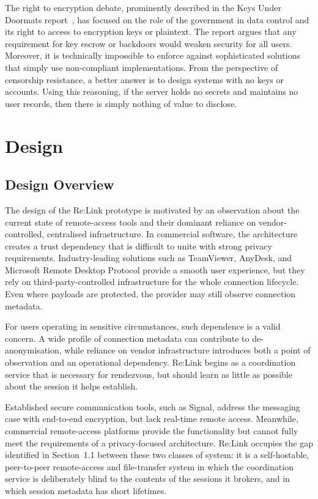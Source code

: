 \documentclass[12pt,a4paper,oneside]{report}
\begin{document}
The right to encryption debate, prominently described in the Keys Under Doormats report~\cite{abelson2015}, has focused on the role of the government in data control and its right to access to encryption keys or plaintext. The report argues that any requirement for key escrow or backdoors would weaken security for all users. Moreover, it is technically impossible to enforce against sophisticated solutions that simply use non-compliant implementations. From the perspective of censorship resistance, a better answer is to design systems with no keys or accounts. Using this reasoning, if the server holds no secrets and maintains no user records, then there is simply nothing of value to disclose.


\chapter{Design}
\label{ch:design}

\section{Design Overview}
\label{sec:design-overview}

The design of the Re:Link prototype is motivated by an observation about the current state of remote-access tools and their dominant reliance on vendor-controlled, centralised infrastructure. In commercial software, the architecture creates a trust dependency that is difficult to unite with strong privacy requirements. Industry-leading solutions such as TeamViewer, AnyDesk, and Microsoft Remote Desktop Protocol provide a smooth user experience, but they rely on third-party-controlled infrastructure for the whole connection lifecycle. Even where payloads are protected, the provider may still observe connection metadata.

For users operating in sensitive circumstances, such dependence is a valid concern. A wide profile of connection metadata can contribute to de-anonymisation, while reliance on vendor infrastructure introduces both a point of observation and an operational dependency. Re:Link begins as a coordination service that is necessary for rendezvous, but should learn as little as possible about the session it helps establish.

Established secure communication tools, such as Signal, address the messaging case with end-to-end encryption, but lack real-time remote access. Meanwhile, commercial remote-access platforms provide the functionality but cannot fully meet the requirements of a privacy-focused architecture. Re:Link occupies the gap identified in Section~1.1 between these two classes of system: it is a self-hostable, peer-to-peer remote-access and file-transfer system in which the coordination service is deliberately blind to the contents of the sessions it brokers, and in which session metadata has short lifetimes.
\end{document}
